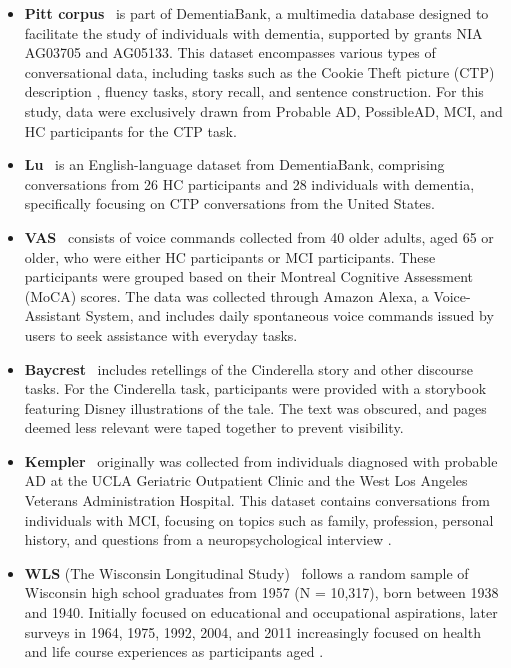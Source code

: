 \begin{itemize}
    \item \textbf{Pitt corpus}~\cite{becker1994dementia} is part of DementiaBank, a multimedia database designed to facilitate the study of individuals with dementia, supported by grants NIA AG03705 and AG05133. This dataset encompasses various types of conversational data, including tasks such as the Cookie Theft picture (CTP) description \cite{goodglass2001bdae}, fluency tasks, story recall, and sentence construction. For this study, data were exclusively drawn from Probable AD, PossibleAD, MCI, and HC participants for the CTP task.
    \item \textbf{Lu}~\cite{lanzi2023dementiabank} is an English-language dataset from DementiaBank, comprising conversations from 26 HC participants and 28 individuals with dementia, specifically focusing on CTP conversations from the United States.
    \item \textbf{VAS}~\cite{liang2022evaluating} consists of voice commands collected from 40 older adults, aged 65 or older, who were either HC participants or MCI participants. These participants were grouped based on their Montreal Cognitive Assessment (MoCA) \cite{hobson2015montreal} scores. The data was collected through Amazon Alexa, a Voice-Assistant System, and includes daily spontaneous voice commands issued by users to seek assistance with everyday tasks. 
    \item \textbf{Baycrest}~\cite{johnston2023spectral} includes retellings of the Cinderella story and other discourse tasks. For the Cinderella task, participants were provided with a storybook featuring Disney illustrations of the tale. The text was obscured, and pages deemed less relevant were taped together to prevent visibility.
    \item \textbf{Kempler}~\cite{kempler1987syntactic} originally was collected from individuals diagnosed with probable AD at the UCLA Geriatric Outpatient Clinic and the West Los Angeles Veterans Administration Hospital. This dataset contains  conversations from individuals with MCI, focusing on topics such as family, profession, personal history, and questions from a neuropsychological interview \cite{kempler1987syntactic}.
    \item \textbf{WLS} (The Wisconsin Longitudinal Study)~\cite{herd2014cohort} follows a random sample of Wisconsin high school graduates from 1957 (N = 10,317), born between 1938 and 1940. Initially focused on educational and occupational aspirations, later surveys in 1964, 1975, 1992, 2004, and 2011 increasingly focused on health and life course experiences as participants aged \cite{herd2014cohort}. 

\end{itemize}
